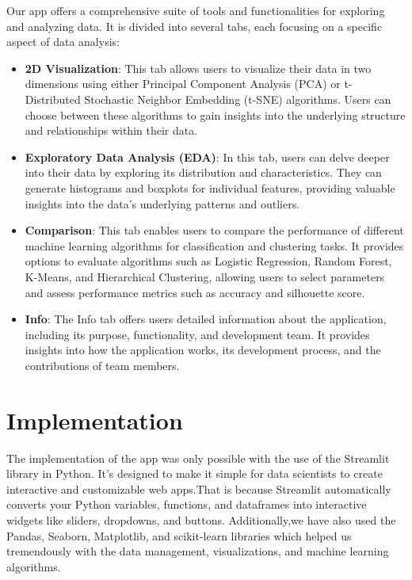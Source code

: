 \documentclass{article}
\begin{document}
Our app offers a comprehensive suite of tools and functionalities for exploring and analyzing data. It is divided into several tabs, each focusing on a specific aspect of data analysis:
\begin{itemize}
\item \textbf{2D Visualization}: This tab allows users to visualize their data in two dimensions using either Principal Component Analysis (PCA) or t-Distributed Stochastic Neighbor Embedding (t-SNE) algorithms. Users can choose between these algorithms to gain insights into the underlying structure and relationships within their data.

\item \textbf{Exploratory Data Analysis (EDA)}: In this tab, users can delve deeper into their data by exploring its distribution and characteristics. They can generate histograms and boxplots for individual features, providing valuable insights into the data's underlying patterns and outliers.

\item \textbf{Comparison}: This tab enables users to compare the performance of different machine learning algorithms for classification and clustering tasks. It provides options to evaluate algorithms such as Logistic Regression, Random Forest, K-Means, and Hierarchical Clustering, allowing users to select parameters and assess performance metrics such as accuracy and silhouette score.

\item \textbf{Info}: The Info tab offers users detailed information about the application, including its purpose, functionality, and development team. It provides insights into how the application works, its development process, and the contributions of team members.
\end{itemize}

\section{Implementation}
The implementation of the app was only possible with the use of the Streamlit library in Python. It's designed to make it simple for data scientists to create interactive and customizable web apps.That is because Streamlit automatically converts your Python variables, functions, and dataframes into interactive widgets like sliders, dropdowns, and buttons. Additionally,we have also used the Pandas, Seaborn, Matplotlib, and scikit-learn libraries which helped us tremendously with the data management, visualizations, and machine learning algorithms.
\end{document}
